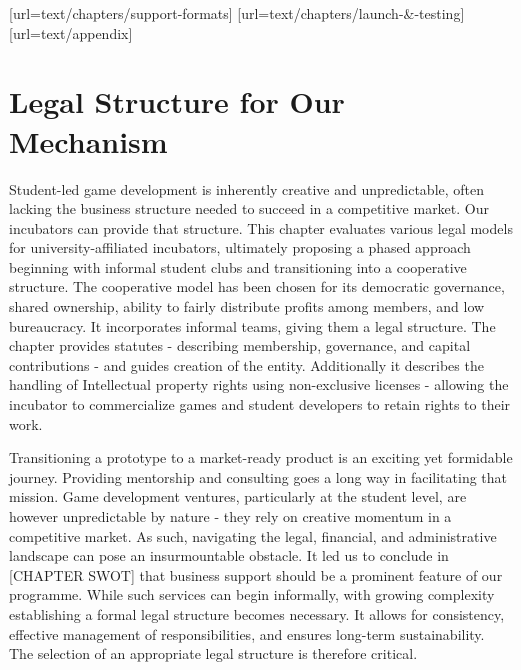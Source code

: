 [url=text/chapters/support-formats]
[url=text/chapters/launch-&-testing]
[url=text/appendix]
\chapter{Legal Structure for Our Mechanism}

\begin{chapterabstract}	
    Student-led game development is inherently creative and unpredictable, often lacking the business structure needed to succeed in a competitive market. Our incubators can provide that structure. This chapter evaluates various legal models for university-affiliated incubators, ultimately proposing a phased approach beginning with informal student clubs and transitioning into a cooperative structure. The cooperative model has been chosen for its democratic governance, shared ownership, ability to fairly distribute profits among members, and low bureaucracy. It incorporates informal teams, giving them a legal structure. The chapter provides statutes - describing membership, governance, and capital contributions - and guides creation of the entity. Additionally it describes the handling of Intellectual property rights using non-exclusive licenses - allowing the incubator to commercialize games and student developers to retain rights to their work.
\end{chapterabstract}

Transitioning a prototype to a market-ready product is an exciting yet formidable journey. Providing mentorship and consulting goes a long way in facilitating that mission. Game development ventures, particularly at the student level, are however unpredictable by nature - they rely on creative momentum in a competitive market. As such, navigating the legal, financial, and administrative landscape can pose an insurmountable obstacle. It led us to conclude in [CHAPTER SWOT] that business support should be a prominent feature of our programme. While such services can begin informally, with growing complexity establishing a formal legal structure becomes necessary. It allows for consistency, effective management of responsibilities, and ensures long-term sustainability. The selection of an appropriate legal structure is therefore critical.

